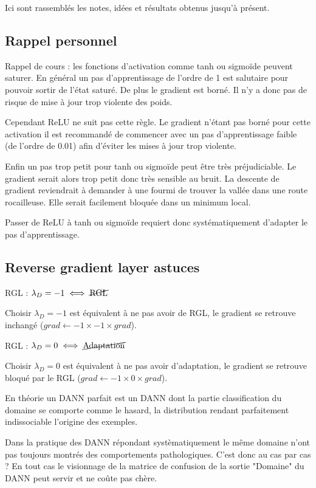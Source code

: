 
Ici sont rassemblés les notes, idées et résultats obtenus jusqu'à présent.

\subsection{Rappel personnel} %
\label{sub:rappel_personnel}

Rappel de cours : les fonctions d'activation comme tanh ou sigmoïde peuvent 
saturer. En général un pas d'apprentissage de l'ordre de 1 est salutaire pour 
pouvoir sortir de l'état saturé. De plus le gradient est borné. Il n'y a donc 
pas de risque de mise à jour trop violente des poids.

Cependant ReLU ne suit pas cette règle. Le gradient n'étant pas borné pour 
cette activation il est recommandé de commencer avec un pas d'apprentissage
faible (de l'ordre de 0.01) afin d'éviter les mises à jour trop violente.

Enfin un pas trop petit pour tanh ou sigmoïde peut être très préjudiciable.
Le gradient serait alors trop petit donc très sensible au bruit.
La descente de gradient reviendrait à demander à une fourmi de trouver la 
vallée dans une route rocailleuse. Elle serait facilement bloquée dans un
minimum local.

Passer de ReLU à tanh ou sigmoïde requiert donc systématiquement d'adapter
le pas d'apprentissage.

\subsection{Reverse gradient layer astuces} %
\label{sub:reverse_gradient_layer_astuce}

RGL : $\lambda_D = -1 \iff \cancel{\text{RGL}}$

Choisir $\lambda_D = -1$ est équivalent à ne pas avoir de RGL, le gradient se 
retrouve inchangé ($grad \gets -1\times-1\times grad $).

RGL : $\lambda_D = 0 \iff \cancel{\text{Adaptation}}$

Choisir $\lambda_D = 0$ est équivalent à ne pas avoir d'adaptation, le 
gradient se retrouve bloqué par le RGL ($grad \gets -1\times0\times grad $).

En théorie un DANN parfait est un DANN dont la partie classification du
domaine se comporte comme le hasard, la distribution rendant parfaitement
indissociable l'origine des exemples.

Dans la pratique des DANN répondant systèmatiquement le même domaine n'ont 
pas toujours montrés des comportements pathologiques. 
C'est donc au cas par cas ?
En tout cas le visionnage de la matrice de confusion de la sortie "Domaine" du
DANN peut servir et ne coûte pas chère.

